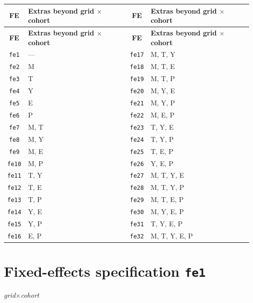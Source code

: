 \documentclass[10pt,landscape]{article}
\begin{document}
\vspace{1.2em}
\noindent
\begin{longtable}{@{}cl@{\hspace{3em}}cl@{}}
\toprule
\textbf{FE} & \textbf{Extras beyond grid $\times$ cohort} &
\textbf{FE} & \textbf{Extras beyond grid $\times$ cohort} \\
\midrule
\endfirsthead
\toprule
\textbf{FE} & \textbf{Extras beyond grid $\times$ cohort} &
\textbf{FE} & \textbf{Extras beyond grid $\times$ cohort} \\
\midrule
\endhead
\texttt{fe1} & --- & \texttt{fe17} & M, T, Y \\
\texttt{fe2} & M & \texttt{fe18} & M, T, E \\
\texttt{fe3} & T & \texttt{fe19} & M, T, P \\
\texttt{fe4} & Y & \texttt{fe20} & M, Y, E \\
\texttt{fe5} & E & \texttt{fe21} & M, Y, P \\
\texttt{fe6} & P & \texttt{fe22} & M, E, P \\
\texttt{fe7} & M, T & \texttt{fe23} & T, Y, E \\
\texttt{fe8} & M, Y & \texttt{fe24} & T, Y, P \\
\texttt{fe9} & M, E & \texttt{fe25} & T, E, P \\
\texttt{fe10} & M, P & \texttt{fe26} & Y, E, P \\
\texttt{fe11} & T, Y & \texttt{fe27} & M, T, Y, E \\
\texttt{fe12} & T, E & \texttt{fe28} & M, T, Y, P \\
\texttt{fe13} & T, P & \texttt{fe29} & M, T, E, P \\
\texttt{fe14} & Y, E & \texttt{fe30} & M, Y, E, P \\
\texttt{fe15} & Y, P & \texttt{fe31} & T, Y, E, P \\
\texttt{fe16} & E, P & \texttt{fe32} & M, T, Y, E, P \\
\bottomrule
\end{longtable}

\clearpage

\tableofcontents
\clearpage

\section*{Fixed-effects specification \texttt{fe1}}
\noindent\textit{grid$\times$cohort}
\vspace{0.5em}
\end{document}
